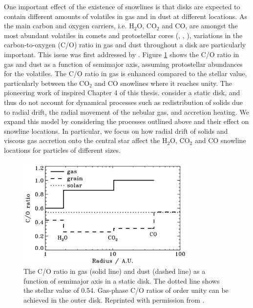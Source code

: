 One important effect of the existence of snowlines is that disks are expected to contain different amounts of volatiles in gas and in dust at different locations. As the main carbon and oxygen carriers, i.e. H$_2$O, CO$_2$ and CO, are amongst the most abundant volatiles in comets and protostellar cores (\citealt{rodgers02}, \citealt{mumma11}, \citealt{henning13}), variations in the carbon-to-oxygen (C/O) ratio in gas and dust throughout a disk are particularly important. This issue was first addressed by \citet{oberg11}. Figure \ref{fig:oberg} shows the C/O ratio in gas and dust as a function of semimajor axis, assuming protostellar abundances for the volatiles. The C/O ratio in gas is enhanced compared to the stellar value, particularly between the CO$_2$ and CO snowlines where it reaches unity. The pioneering work of \citet{oberg11} inspired Chapter 4 of this thesis. \citet{oberg11} consider a static disk, and thus do not account for dynamical processes such as redistribution of solids due to radial drift, the radial movement of the nebular gas, and accretion heating. We expand this model by considering the processes outlined above and their effect on snowline locations. In particular, we focus on how radial drift of solids and viscous gas accretion onto the central star affect the H$_2$O, CO$_2$ and CO snowline locations for particles of different sizes. %

\begin{figure}[h]
\centering
\includegraphics[width=0.8\textwidth]{figures/oberg11.png}
\caption{The C/O ratio in gas (solid line) and dust (dashed line) as a function of semimajor axis in a static disk. The dotted line shows the stellar value of 0.54. Gas-phase C/O ratios of order unity can be achieved in the outer disk. Reprinted with permission from \citet{oberg11}. }
\label{fig:oberg}
\end{figure}



